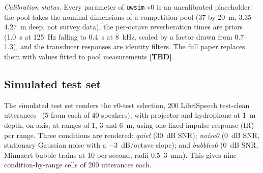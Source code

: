 \documentclass[conference]{IEEEtran}
\newcommand{\tbd}{\textbf{[TBD]}}
\begin{document}
\textit{Calibration status.} Every parameter of \texttt{uwsim} v0 is an uncalibrated placeholder: the
pool takes the nominal dimensions of a competition pool (37 by 20~m, 3.35--4.27~m deep, not survey
data), the per-octave reverberation times are priors (1.0~s at 125~Hz falling to 0.4~s at 8~kHz, scaled
by a factor drawn from 0.7--1.3), and the transducer responses are identity filters. The full paper
replaces them with values fitted to pool measurements \tbd.

\subsection{Simulated test set}
\label{sec:simtest}
The simulated test set renders the v0-test selection, 200 LibriSpeech test-clean
utterances~\cite{panayotov2015} (5 from each of 40 speakers), with projector and hydrophone at 1~m
depth, on-axis, at ranges of 1, 3 and 6~m, using one fixed impulse response (IR) per range. Three
conditions are rendered: \emph{quiet} (30~dB SNR); \emph{noise0} (0~dB SNR, stationary Gaussian noise
with a $-3$~dB/octave slope); and \emph{bubbles0} (0~dB SNR, Minnaert bubble trains at 10 per second,
radii 0.5--3~mm). This gives nine condition-by-range cells of 200 utterances each.
\end{document}
